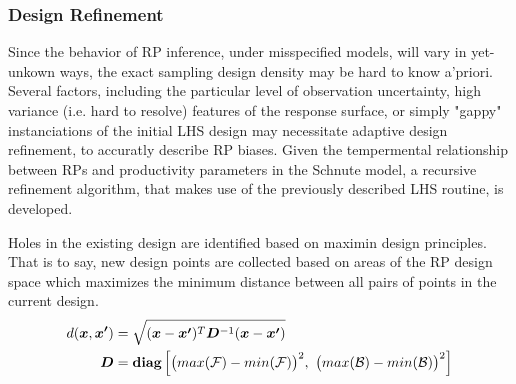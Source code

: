 \documentclass[12pt]{article}
\begin{document}



%
\subsubsection{Design Refinement}

%
Since the behavior of RP inference, under misspecified models, will vary in 
yet-unkown ways, the exact sampling design density may be hard to know a'priori. 
Several factors, including the particular level of observation uncertainty, 
high variance (i.e. hard to resolve) features of the response surface, or 
simply "gappy" instanciations of the initial LHS design may necessitate 
adaptive design refinement, to accuratly describe RP biases. Given the 
tempermental relationship between RPs and productivity parameters in the Schnute 
model, a recursive refinement algorithm, that makes use of the previously 
described LHS routine, is developed. 

%
Holes in the existing design are identified based on maximin design principles.
That is to say, new design points are collected based on areas of the RP design 
space which maximizes the minimum distance between all pairs of points in the 
current design. 
\begin{align}
d(\bm{x}, \bm{x'}) &= \sqrt{(\bm{x}-\bm{x'})^T\bm{D}^{-1}(\bm{x}-\bm{x'})}\\
\bm{D} &= \bm{\mbox{diag}\left[} \big(max(\mathcal{F})-min(\mathcal{F})\big)^2, ~\big(max(\mathcal{B})-min(\mathcal{B})\big)^2 \bm{\right]} \nonumber
\end{align}
\end{document}

